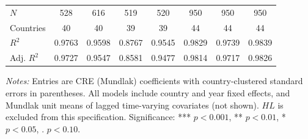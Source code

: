 \begin{table}[!htbp]
\begin{tabular}{lccccccc}
$N$ & 528 & 616 & 519 & 520 & 950 & 950 & 950 \\
Countries & 40 & 40 & 39 & 39 & 44 & 44 & 44 \\
$R^2$ & 0.9763 & 0.9598 & 0.8767 & 0.9545 & 0.9829 & 0.9739 & 0.9839 \\
Adj. $R^2$ & 0.9727 & 0.9547 & 0.8581 & 0.9477 & 0.9814 & 0.9717 & 0.9826 \\
\hline
\end{tabular}
\vspace{0.4em}
\begin{minipage}{0.96\linewidth}
\footnotesize
\textit{Notes:} Entries are CRE (Mundlak) coefficients with country-clustered standard errors in parentheses. All models include country and year fixed effects, and Mundlak unit means of lagged time-varying covariates (not shown). $HL$ is excluded from this specification. Significance: *** $p<0.001$, ** $p<0.01$, * $p<0.05$, . $p<0.10$.
\end{minipage}
\end{table}
